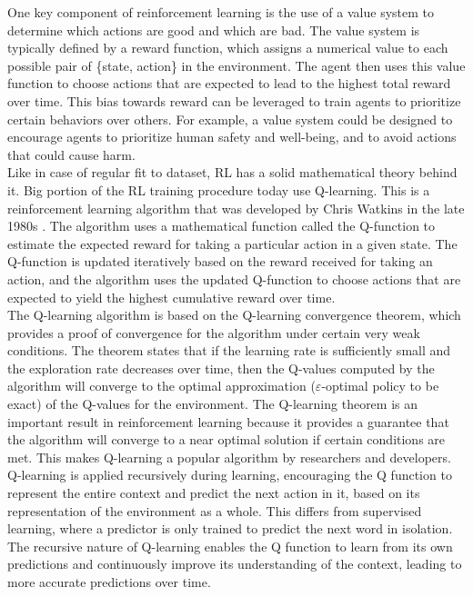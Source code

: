 \documentclass{article}
\begin{document}
One key component of reinforcement learning is the use of a value system to determine which actions are good and which are bad. The value system is typically defined by a reward function, which assigns a numerical value to each possible pair of \{state, action\} in the environment. The agent then uses this value function to choose actions that are expected to lead to the highest total reward over time. This bias towards reward can be leveraged to train agents to prioritize certain behaviors over others. For example, a value system could be designed to encourage agents to prioritize human safety and well-being, and to avoid actions that could cause harm.\\

Like in case of regular fit to dataset, RL has a solid mathematical theory behind it. Big portion of the RL training procedure today use Q-learning. This is a reinforcement learning algorithm that was developed by Chris Watkins in the late 1980s \cite{watkins1992q}. The algorithm uses a mathematical function called the Q-function to estimate the expected reward for taking a particular action in a given state. The Q-function is updated iteratively based on the reward received for taking an action, and the algorithm uses the updated Q-function to choose actions that are expected to yield the highest cumulative reward over time.\\

The Q-learning algorithm is based on the Q-learning convergence theorem\cite{even-dar2001convergence, melo2011convergence}, which provides a proof of convergence for the algorithm under certain very weak conditions. The theorem states that if the learning rate is sufficiently small and the exploration rate decreases over time, then the Q-values computed by the algorithm will converge to the optimal approximation ($\varepsilon$-optimal policy to be exact) of the Q-values for the environment. The Q-learning theorem is an important result in reinforcement learning because it provides a guarantee that the algorithm will converge to a near optimal solution if certain conditions are met. This makes Q-learning a popular algorithm by researchers and developers.\\

Q-learning is applied recursively during learning, encouraging the Q function to represent the entire context and predict the next action in it, based on its representation of the environment as a whole. This differs from supervised learning, where a predictor is only trained to predict the next word in isolation. The recursive nature of Q-learning enables the Q function to learn from its own predictions and continuously improve its understanding of the context, leading to more accurate predictions over time.\\
\end{document}
